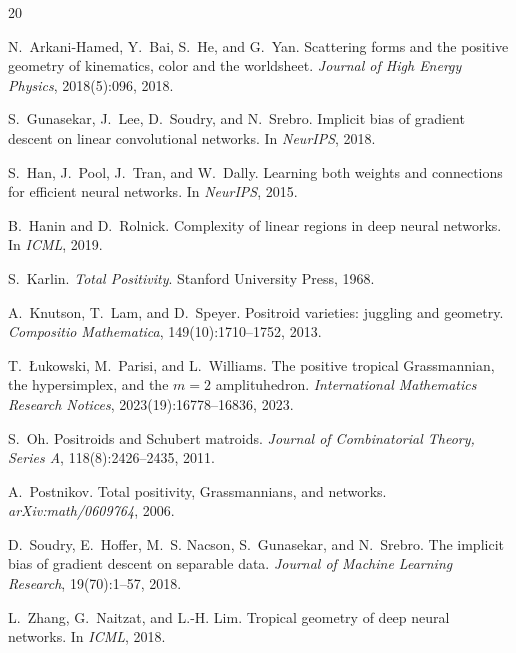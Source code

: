 \documentclass[11pt]{article}
\theoremstyle{definition}
\theoremstyle{remark}
\begin{document}
\clearpage
\begin{thebibliography}{20}

N.~Arkani-Hamed, Y.~Bai, S.~He, and G.~Yan.
\newblock Scattering forms and the positive geometry of kinematics,
  color and the worldsheet.
\newblock \emph{Journal of High Energy Physics}, 2018(5):096, 2018.

S.~Gunasekar, J.~Lee, D.~Soudry, and N.~Srebro.
\newblock Implicit bias of gradient descent on linear convolutional
  networks.
\newblock In \emph{NeurIPS}, 2018.

S.~Han, J.~Pool, J.~Tran, and W.~Dally.
\newblock Learning both weights and connections for efficient neural
  networks.
\newblock In \emph{NeurIPS}, 2015.

B.~Hanin and D.~Rolnick.
\newblock Complexity of linear regions in deep neural networks.
\newblock In \emph{ICML}, 2019.

S.~Karlin.
\newblock \emph{Total Positivity}.
\newblock Stanford University Press, 1968.

A.~Knutson, T.~Lam, and D.~Speyer.
\newblock Positroid varieties: juggling and geometry.
\newblock \emph{Compositio Mathematica}, 149(10):1710--1752, 2013.

T.~{\L}ukowski, M.~Parisi, and L.~Williams.
\newblock The positive tropical Grassmannian, the hypersimplex, and
  the $m=2$ amplituhedron.
\newblock \emph{International Mathematics Research Notices},
  2023(19):16778--16836, 2023.

S.~Oh.
\newblock Positroids and Schubert matroids.
\newblock \emph{Journal of Combinatorial Theory, Series A},
  118(8):2426--2435, 2011.

A.~Postnikov.
\newblock Total positivity, Grassmannians, and networks.
\newblock \emph{arXiv:math/0609764}, 2006.

D.~Soudry, E.~Hoffer, M.~S. Nacson, S.~Gunasekar, and N.~Srebro.
\newblock The implicit bias of gradient descent on separable data.
\newblock \emph{Journal of Machine Learning Research}, 19(70):1--57,
  2018.

L.~Zhang, G.~Naitzat, and L.-H. Lim.
\newblock Tropical geometry of deep neural networks.
\newblock In \emph{ICML}, 2018.

\end{thebibliography}
\end{document}
